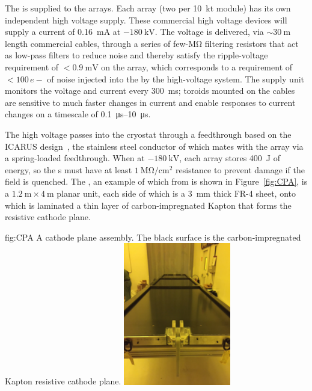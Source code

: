 The  is supplied to the  arrays. Each  array (two per \SI{10}{\kilo\tonne} module) has its own independent high voltage supply. These commercial high voltage devices will supply a current of \SI{0.16}{\milli\ampere} at $-\SI{180}{\kilo\volt}$. The voltage is delivered, via $\sim\!\SI{30}{\meter}$ length commercial cables, through a series of few-\si{\mega\ohm} filtering resistors that act as low-pass filters to reduce noise and thereby satisfy the ripple-voltage requirement of $<\!\SI{0.9}{\milli\volt}$ on the  array, which corresponds to a requirement of $<\!100\,e{-}$ of noise injected into the  by the high-voltage system. The supply unit monitors the voltage and current every \SI{300}{\milli\second}; toroids mounted on the cables are sensitive to much faster changes in current and enable responses to current changes on a timescale of \SIrange{0.1}{10}{\micro\second}.

The high voltage passes into the cryostat through a feedthrough based on the ICARUS design~\cite{Icarus-T600}, the stainless steel conductor of which mates with the  array via a spring-loaded feedthrough.
When at $-\SI{180}{\kilo\volt}$, each  array stores \SI{400}{\joule} of energy, so the s must have at least $\SI{1}{\mega\ohm/\cm^{2}}$ resistance to prevent damage if the field is quenched. The , an example of which from  is shown in Figure~\ref{fig:CPA}, is a $\SI{1.2}{\meter}\times\SI{4}{\meter}$ planar unit, each side of which is a \SI{3}{\mm} thick FR-4 sheet, onto which is laminated a thin layer of carbon-impregnated Kapton that forms the resistive cathode plane.

\begin{dunefigure}{fig:CPA}
{A   cathode plane assembly. The black surface is the carbon-impregnated Kapton resistive cathode plane.}
\includegraphics[width=0.35\textwidth]{graphics/CPA.pdf}
\end{dunefigure}

